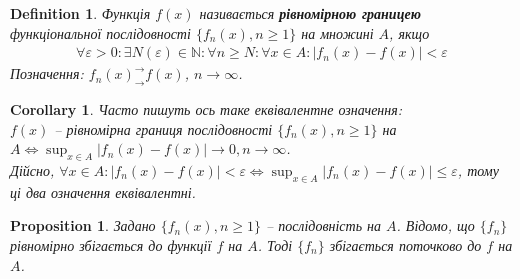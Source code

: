 \documentclass[a4paper, 10pt]{article}
\def\huge{\displaystyle}
\theoremstyle{theoremdd}
\theoremstyle{theoremdd}
\theoremstyle{theoremdd}
\newtheorem{definition}[theorem]{Definition}
\theoremstyle{theoremdd}
\theoremstyle{theoremdd}
\theoremstyle{theoremdd}
\newtheorem{proposition}[theorem]{Proposition}
\theoremstyle{theoremdd}
\newtheorem{remark}[theorem]{Remark}
\theoremstyle{theoremdd}
\theoremstyle{theoremdd}
\newtheorem{corollary}[theorem]{Corollary}
\begin{document}
\iffalse
\begin{figure}[H]
\centering
\begin{tikzpicture}
\draw[thick, ->] (-0.5,0)--(5.5,0) node[anchor = north] {$x$};
\draw[thick, ->] (0,-0.5)--(0,6) node[anchor = east] {$y$};


\foreach \i in {1,2,5,10,80}
\draw[thick, domain=0:5, variable=\x, samples = 1000] plot({\x}, {(\i*\x)/(1+\i+\x)}) node[anchor = west, scale=0.8] {$n =$ \i};

\draw[thick, domain=0:5, variable=\x, samples = 1000, red] plot({\x}, {\x});
\node[red, scale=0.8] at(2,3) {$f(x) = x$};
\end{tikzpicture}
\caption*{Чорним маємо сім'ю функцій $f_n(x) = \dfrac{nx}{1+n+x}$. Вони прямують до червоної функції. Всі функції визначені на $[0,5]$.}
\end{figure}
\fi

\iffalse
\begin{remark}
Якщо всі функції парні/непарні, то точкова границя теж парна/непарна. Якщо всі функції монотонні, то точкова границя буде також монотонною.\\
\textit{Випливає з нерівностей границь.}
\end{remark}
\fi

\begin{definition}
Функція $f(x)$ називається \textbf{рівномірною границею} функціональної послідовності $\{f_n(x), n \geq 1 \}$ на множині $A$, якщо
\begin{align*}
\forall \varepsilon > 0: \exists N(\varepsilon) \in \mathbb{N}: \forall n \geq N: \forall x \in A: |f_n(x)-f(x)| < \varepsilon
\end{align*}
Позначення: $f_n(x)^\rightarrow_\rightarrow f(x)$, $n \to \infty$.
\end{definition}

\begin{corollary}
Часто пишуть ось таке еквівалентне означення:\\
$f(x)$ -- рівномірна границя послідовності $\{f_n(x), n \geq 1\}$ на $A \iff \huge\sup_{x \in A} |f_n(x) - f(x)| \to 0, n \to \infty$.\\
\textit{Дійсно, $\forall x \in A: |f_n(x)-f(x)| < \varepsilon \iff \huge\sup_{x \in A} |f_n(x) - f(x)| \leq \varepsilon$, тому ці два означення еквівалентні}.
\end{corollary}

\begin{proposition}
Задано $\{f_n(x), n \geq 1\}$ -- послідовність на $A$. Відомо, що $\{f_n\}$ рівномірно збігається до функції $f$ на $A$. Тоді $\{f_n\}$ збігається поточково до $f$ на $A$.
\end{proposition}
\end{document}
